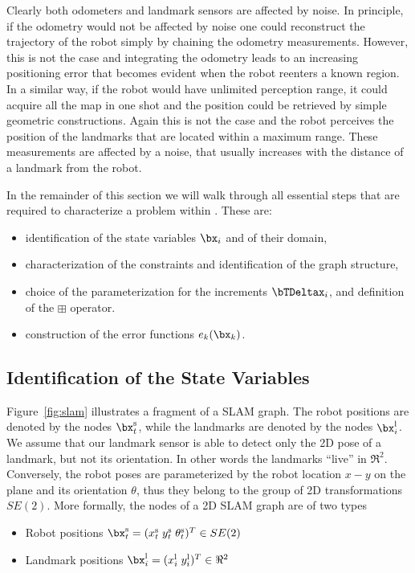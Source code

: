 \documentclass[a4paper]{article}
\begin{document}
Clearly both odometers and landmark sensors are affected by noise.  In
principle, if the odometry would not be affected by noise one could
reconstruct the trajectory of the robot simply by chaining the
odometry measurements. However, this is not the case and integrating
the odometry leads to an increasing positioning error that becomes
evident when the robot reenters a known region. In a similar way,
if the robot would have unlimited perception range, it could acquire
all the map in one shot and the position could be retrieved by simple
geometric constructions. Again this is not the case and the robot
perceives the position of the landmarks that are located within a
maximum range. These measurements are affected by a noise, that
usually increases with the distance of a landmark from the robot.

In the remainder of this section we will walk through all essential
steps that are required to characterize a problem within \gopt{}.
These are:
\begin{itemize}
\item identification of the state variables $\bx_i$ and of their domain,
\item characterization of the constraints and identification of the graph structure,
\item choice of the parameterization for the increments $\bTDeltax_i$, and definition of the
$\boxplus$ operator.
\item construction of the error functions $e_k(\bx_k)$.
\end{itemize}

\subsection{Identification of the State Variables}
Figure~\ref{fig:slam} illustrates a fragment of a SLAM graph.  The
robot positions are denoted by the nodes $\bx^\mathrm{s}_t$, while the
landmarks are denoted by the nodes $\bx^\mathrm{l}_i$. We assume that
our landmark sensor is able to detect only the 2D pose of a landmark,
but not its orientation.  In other words the landmarks ``live'' in
$\Re^2$.  Conversely, the robot poses are parameterized by the robot
location $x-y$ on the plane and its orientation $\theta$, thus they
belong to the group of 2D transformations $SE(2)$.  More
formally, the nodes of a 2D SLAM graph are of two types
\begin{itemize}
\item Robot positions $\bx^\mathrm{s}_t = ( x^\mathrm{s}_t  \; y^\mathrm{s}_t \; \theta^\mathrm{s}_t)^T \in SE(2)$
\item Landmark positions $\bx^\mathrm{l}_i = ( x^\mathrm{l}_i  \; y^\mathrm{l}_i )^T \in \Re^2$
\end{itemize}
\end{document}
